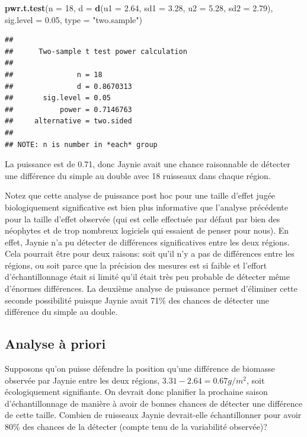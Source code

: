 \documentclass[
  12pt,
]{book}
\newenvironment{Shaded}{\begin{snugshade}}{\end{snugshade}}
\newcommand{\DataTypeTok}[1]{\textcolor[rgb]{0.13,0.29,0.53}{#1}}
\newcommand{\DecValTok}[1]{\textcolor[rgb]{0.00,0.00,0.81}{#1}}
\newcommand{\FloatTok}[1]{\textcolor[rgb]{0.00,0.00,0.81}{#1}}
\newcommand{\KeywordTok}[1]{\textcolor[rgb]{0.13,0.29,0.53}{\textbf{#1}}}
\newcommand{\NormalTok}[1]{#1}
\newcommand{\StringTok}[1]{\textcolor[rgb]{0.31,0.60,0.02}{#1}}
\begin{document}
\begin{Shaded}
\begin{Highlighting}[]
\KeywordTok{pwr.t.test}\NormalTok{(}\DataTypeTok{n =} \DecValTok{18}\NormalTok{, }\DataTypeTok{d =} \KeywordTok{d}\NormalTok{(}\DataTypeTok{u1 =} \FloatTok{2.64}\NormalTok{, }\DataTypeTok{sd1 =} \FloatTok{3.28}\NormalTok{, }\DataTypeTok{u2 =} \FloatTok{5.28}\NormalTok{, }\DataTypeTok{sd2 =} \FloatTok{2.79}\NormalTok{), }\DataTypeTok{sig.level =} \FloatTok{0.05}\NormalTok{, }\DataTypeTok{type =} \StringTok{"two.sample"}\NormalTok{)}
\end{Highlighting}
\end{Shaded}

\begin{verbatim}
## 
##      Two-sample t test power calculation 
## 
##               n = 18
##               d = 0.8670313
##       sig.level = 0.05
##           power = 0.7146763
##     alternative = two.sided
## 
## NOTE: n is number in *each* group
\end{verbatim}

La puissance est de 0.71, donc Jaynie avait une chance raisonnable de détecter une différence du simple au double avec 18 ruisseaux dans chaque région.

Notez que cette analyse de puissance post hoc pour une taille d'effet jugée biologiquement significative est bien plus informative que l'analyse précédente pour la taille d'effet observée (qui est celle effectuée par défaut par bien des néophytes et de trop nombreux logiciels qui essaient de penser pour nous).
En effet, Jaynie n'a pu détecter de différences significatives entre les deux régions.
Cela pourrait être pour deux raisons: soit qu'il n'y a pas de différences entre les régions, ou soit parce que la précision des mesures est si faible et l'effort d'échantillonnage était si limité qu'il était très peu probable de détecter même d'énormes différences.
La deuxième analyse de puissance permet d'éliminer cette seconde possibilité puisque Jaynie avait 71\% des chances de détecter une différence du simple au double.

\hypertarget{analyse-uxe0-priori}{%
\subsection{Analyse à priori}\label{analyse-uxe0-priori}}

Supposons qu'on puisse défendre la position qu'une différence de biomasse observée par Jaynie entre les deux régions, \(3.31- 2.64=0.67g/m^2\), soit écologiquement signifiante.
On devrait donc planifier la prochaine saison d'échantillonnage de manière à avoir de bonnes chances de détecter une différence de cette taille.
Combien de ruisseaux Jaynie devrait-elle échantillonner pour avoir 80\% des chances de la détecter (compte tenu de la variabilité observée)?
\end{document}
